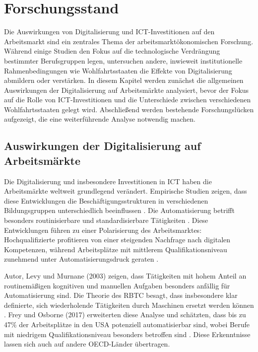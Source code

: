 
\section{Forschungsstand}

Die Auswirkungen von Digitalisierung und \ac{ICT}-Investitionen auf den Arbeitsmarkt sind
ein zentrales Thema der arbeitsmarktökonomischen Forschung. Während einige Studien den
Fokus auf die technologische Verdrängung bestimmter Berufsgruppen legen, untersuchen
andere, inwieweit institutionelle Rahmenbedingungen wie Wohlfahrtsstaaten die Effekte von
Digitalisierung abmildern oder verstärken. In diesem Kapitel werden zunächst die
allgemeinen Auswirkungen der Digitalisierung auf Arbeitsmärkte analysiert, bevor der Fokus
auf die Rolle von \ac{ICT}-Investitionen und die Unterschiede zwischen verschiedenen
Wohlfahrtsstaaten gelegt wird. Abschließend werden bestehende Forschungslücken aufgezeigt,
die eine weiterführende Analyse notwendig machen.


\subsection{Auswirkungen der Digitalisierung auf Arbeitsmärkte}

Die Digitalisierung und insbesondere Investitionen in \ac{ICT} haben die Arbeitsmärkte
weltweit grundlegend verändert. Empirische Studien zeigen, dass diese Entwicklungen die
Beschäftigungsstrukturen in verschiedenen Bildungsgruppen unterschiedlich beeinflussen
\parencite[vgl.][S. 7]{autor2013thegrowth}. Die Automatisierung betrifft besonders
routinisierbare und standardisierbare Tätigkeiten \parencite[vgl.][S. 20]{frey2013thefuture}.
Diese Entwicklungen führen zu einer Polarisierung des Arbeitsmarktes: Hochqualifizierte
profitieren von einer steigenden Nachfrage nach digitalen Kompetenzen, während Arbeitsplätze
mit mittlerem Qualifikationsniveau zunehmend unter Automatisierungsdruck geraten
\parencite[vgl.][S. 2509]{goos2014explaining}.

Autor, Levy und Murnane (2003) zeigen, dass Tätigkeiten mit hohem Anteil an routinemäßigen
kognitiven und manuellen Aufgaben besonders anfällig für Automatisierung sind. Die Theorie
des \ac{RBTC} besagt, dass insbesondere klar definierte, sich wiederholende Tätigkeiten durch
Maschinen ersetzt werden können \parencite[vgl.][S. 1281]{autor2003theskill}. Frey und Osborne
(2017) erweiterten diese Analyse und schätzten, dass bis zu 47\% der Arbeitsplätze in den USA
potenziell automatisierbar sind, wobei Berufe mit niedrigem Qualifikationsniveau besonders
betroffen sind \parencite[vgl.][S. 254]{frey2013thefuture}. Diese Erkenntnisse lassen sich auch
auf andere \ac{OECD}-Länder übertragen.

